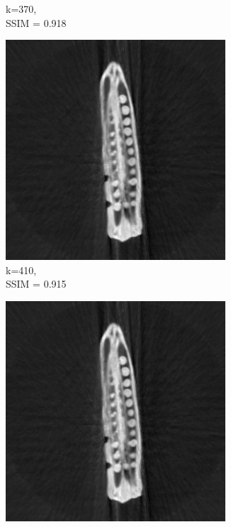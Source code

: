 \documentclass[journal]{IEEEtran}
\begin{document}
\begin{figure}[h]
\begin{subfigure}[b]{0.24\linewidth}
        \caption{k=370,\\ SSIM = 0.918}
     \end{subfigure}
   \begin{subfigure}[b]{0.24\linewidth}
        \includegraphics[width=\textwidth]{../images/okra/2D_okra/weighted_pca410.png}
        \caption{k=410,\\ SSIM = 0.915}
     \end{subfigure}
   \begin{subfigure}[b]{0.24\linewidth}
        \includegraphics[width=\textwidth]{../images/okra/2D_okra/weighted_pca450.png}

\end{subfigure}
\end{figure}
\end{document}
